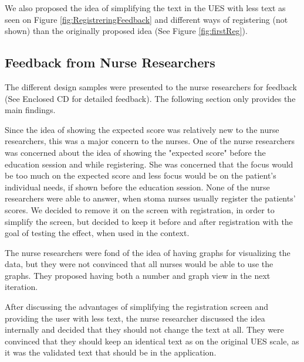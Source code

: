 We also proposed the idea of simplifying the text in the UES with less text as seen on Figure \ref{fig:RegistreringFeedback} and different ways of registering (not shown) than the originally proposed idea (See Figure \ref{fig:firstReg}). 
 
%
%

\subsection{Feedback from Nurse Researchers}
The different design samples were presented to the nurse researchers for feedback (See Enclosed CD for detailed feedback). The following section only provides the main findings. 

Since the idea of showing the expected score was relatively new to the nurse researchers, this was a major concern to the nurses. One of the nurse researchers was concerned about the idea of showing the "expected score" before the education session and while registering. She was concerned that the focus would be too much on the expected score and less focus would be on the patient's individual needs, if shown before the education session. None of the nurse researchers were able to answer, when stoma nurses usually register the patients' scores. We decided to remove it on the screen with registration, in order to simplify the screen, but decided to keep it before and after registration with the goal of testing the effect, when used in the context. 

The nurse researchers were fond of the idea of having graphs for visualizing the data, but they were not convinced that all nurses would be able to use the graphs. They proposed having both a number and graph view in the next iteration. 

After discussing the advantages of simplifying the registration screen and providing the user with less text, the nurse researcher discussed the idea internally and decided that they should not change the text at all. They were convinced that they should keep an identical text as on the original UES scale, as it was the validated text that should be in the application. 


